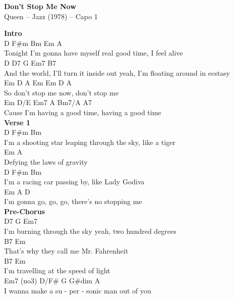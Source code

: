 \documentclass[a4paper]{article}
\begin{document}
    \begin{center}
        \textbf{Don't Stop Me Now}
        ~\\
        Queen -- Jazz (1978)
         -- Capo 1
    \end{center}
    {
        \scriptsize
        \textbf{Intro}
        ~\\
        {
            \cutive
            \obeyspaces
  D                      F\#m        Bm                Em   A
\\
Tonight I'm gonna have myself real good time, I feel alive
\\
        D           D7              G           Em7                B7
\\
And the world, I'll turn it inside out yeah, I'm floating around in ecstasy
\\
   Em    D    A  Em   Em    D    A
\\
So don't stop me now, don't stop me
\\
          Em       D/E  Em7   A         Bm7/A  A7
\\
Cause I'm having a good time, having a  good   time
\\

        }
        \textbf{Verse 1}
        ~\\
        {
            \cutive
            \obeyspaces
      D                                 F\#m          Bm
\\
I'm a shooting star leaping through the sky, like a tiger
\\
             Em          A
\\
Defying the laws of gravity
\\
      D                  F\#m              Bm
\\
I'm a racing car passing by, like Lady Godiva
\\
          Em          A                    D
\\
I'm gonna go, go, go, there's no stopping me
\\

        }
        \textbf{Pre-Chorus}
        ~\\
        {
            \cutive
            \obeyspaces
    D7                   G           Em7
\\
I'm burning through the sky yeah, two hundred degrees
\\
                B7                Em
\\
That's why they call me Mr. Fahrenheit
\\
    B7                         Em
\\
I'm travelling at the speed of light
\\
               Em7 (no3)  D/F\#  G       G\#dim A
\\
I wanna make a su - per - sonic man out  of    you
\\

}}
\end{document}
